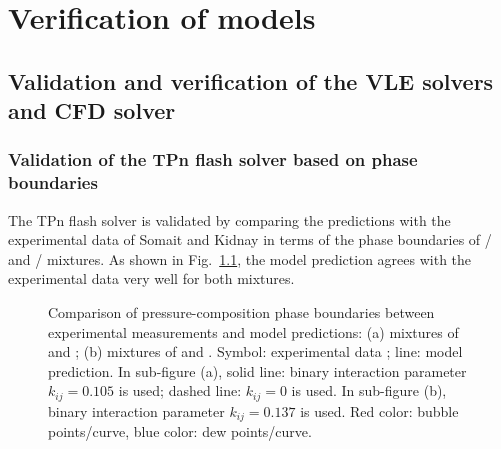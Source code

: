 \chapter{Verification of models}
\label{verifi_chapter}

\section{Validation and verification of the VLE solvers and CFD solver} \label{App:vali}


    \subsection{Validation of the TPn flash solver based on phase boundaries}
    The TPn flash solver is validated by comparing the predictions with the experimental data of Somait and Kidnay \cite{somait1978liquid} in terms of the phase boundaries of / and / mixtures. As shown in Fig.~\ref{v1}, the model prediction agrees with the experimental data very well for both mixtures.
    \begin{figure}[htbp]
        \centering
        \caption{Comparison of pressure-composition phase boundaries between experimental measurements and model predictions: (a) mixtures of  and ; (b) mixtures of  and . Symbol: experimental data \citep{somait1978liquid}; line: model prediction. In sub-figure (a), solid line: binary interaction parameter $k_{ij}=0.105$ is used; dashed line: $k_{ij}=0$ is used. In sub-figure (b), binary interaction parameter $k_{ij}=0.137$ is used. Red color: bubble points/curve, blue color: dew points/curve.}
        \label{v1}
    \end{figure}



